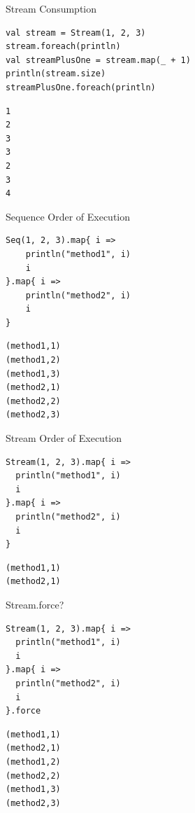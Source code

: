 \documentclass[xcolor=svgnames]{beamer}
\begin{document}
    \begin{frame}[fragile] %
    {Stream Consumption}
        \begin{Verbatim}[formatcom=\sffamily]
val stream = Stream(1, 2, 3)
stream.foreach(println)
val streamPlusOne = stream.map(_ + 1)
println(stream.size)
streamPlusOne.foreach(println)
        \end{Verbatim}

        \noindent\makebox[\linewidth]{\rule{\paperwidth}{0.4pt}}

        \pause

        \begin{Verbatim}[formatcom=\sffamily]
1
2
3
3
2
3
4
        \end{Verbatim}
    \end{frame}

    \begin{frame}[fragile] %
    {Sequence Order of Execution}
        \begin{Verbatim}[formatcom=\sffamily]
Seq(1, 2, 3).map{ i =>
    println("method1", i)
    i
}.map{ i =>
    println("method2", i)
    i
}
        \end{Verbatim}

        \noindent\makebox[\linewidth]{\rule{\paperwidth}{0.4pt}}

        \pause

        \begin{Verbatim}[formatcom=\sffamily]
(method1,1)
(method1,2)
(method1,3)
(method2,1)
(method2,2)
(method2,3)
        \end{Verbatim}
    \end{frame}

    \begin{frame}[fragile] %
    {Stream Order of Execution}
        \begin{Verbatim}[formatcom=\sffamily]
Stream(1, 2, 3).map{ i =>
  println("method1", i)
  i
}.map{ i =>
  println("method2", i)
  i
}
        \end{Verbatim}

        \noindent\makebox[\linewidth]{\rule{\paperwidth}{0.4pt}}
        \pause

        \begin{Verbatim}[formatcom=\sffamily]
(method1,1)
(method2,1)
        \end{Verbatim}
    \end{frame}

    \begin{frame}[fragile] %
    {Stream.force?}
        \begin{Verbatim}[formatcom=\sffamily]
Stream(1, 2, 3).map{ i =>
  println("method1", i)
  i
}.map{ i =>
  println("method2", i)
  i
}.force
        \end{Verbatim}

        \noindent\makebox[\linewidth]{\rule{\paperwidth}{0.4pt}}

        \pause

        \begin{Verbatim}[formatcom=\sffamily]
(method1,1)
(method2,1)
(method1,2)
(method2,2)
(method1,3)
(method2,3)
        \end{Verbatim}
    \end{frame}
\end{document}
